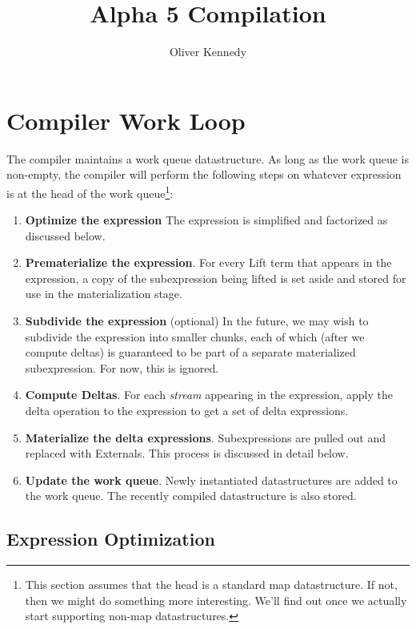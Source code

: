 \documentclass[11pt]{amsart}
\title{Alpha 5 Compilation}
\author{Oliver Kennedy}
\begin{document}
\maketitle

\section{Compiler Work Loop}

The compiler maintains a work queue datastructure.  As long as the work queue is non-empty, the compiler will perform the following steps on whatever expression is at the head of the work queue\footnote{This section assumes that the head is a standard map datastructure.  If not, then we might do something more interesting.  We'll find out once we actually start supporting non-map datastructures.}:

\begin{enumerate}
\item {\bf Optimize the expression} The expression is simplified and factorized as discussed below.

\item {\bf Prematerialize the expression}.  For every Lift term that appears in the expression, a copy of the subexpression being lifted is set aside and stored for use in the materialization stage.  

\item {\bf Subdivide the expression} (optional) In the future, we may wish to subdivide the expression into smaller chunks, each of which (after we compute deltas) is guaranteed to be part of a separate materialized subexpression.  For now, this is ignored.

\item {\bf Compute Deltas}.  For each {\em stream} appearing in the expression, apply the delta operation to the expression to get a set of delta expressions.

\item {\bf Materialize the delta expressions}.  Subexpressions are pulled out and replaced with Externals.  This process is discussed in detail below.

\item {\bf Update the work queue}.  Newly instantiated datastructures are added to the work queue.  The recently compiled datastructure is also stored.
\end{enumerate}

\subsection{Expression Optimization}
\end{document}

